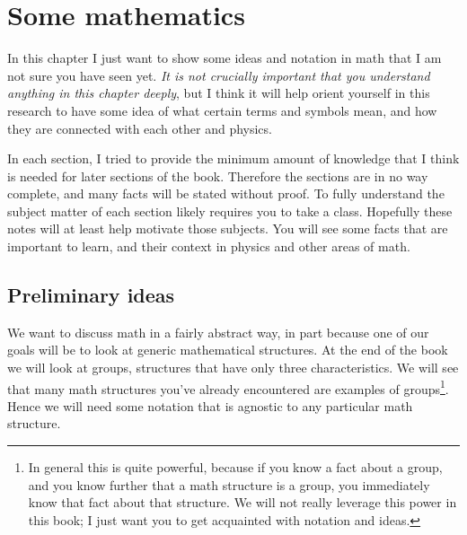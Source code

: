 \chapter{Some mathematics}\label{ch:group}


In this chapter I just want to show some ideas and notation in math that I am
not sure you have seen yet. {\it It is not crucially important that you understand
anything in this chapter deeply}, but I think it will help orient
yourself in this research to have some idea of what certain terms and symbols
mean, and how they are connected with each other and physics.

In each section, I tried to provide the minimum amount of knowledge that I think is
needed for later sections of the book. Therefore the sections are in no way
complete, and many facts will be stated without proof. To fully understand the
subject matter of each section likely requires you to take a class. Hopefully
these notes will at least help motivate those subjects. You will see some facts
that are important to learn, and their context in physics and other areas of
math.


\section{Preliminary ideas}

We want to discuss math in a fairly abstract way, in part because one of our
goals will be to look at generic mathematical structures. At the end of the book 
we will look at groups, structures that have only three characteristics. We will
 see that many math structures you've already encountered are examples of 
groups\footnote{In
general this is quite powerful, because if you know a fact about a group, and
you know further that a math structure is a group, you immediately know that
fact about that structure. We will not really leverage this power in this book;
I just want you to get acquainted with notation and ideas.}.
Hence we will need some notation that is agnostic to any particular math
structure.

